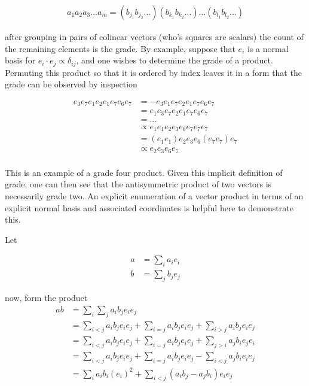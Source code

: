 \begin{align*}
a_1 a_2 a_3 ... a_m = (b_{j_1} b_{j_2} ... ) (b_{k_1} b_{k_2} ... ) ...  (b_{l_1} b_{l_2} ... )
\end{align*}

after grouping in pairs of colinear vectors (who's squares are scalars) the count of the remaining elements is the grade.  By  
example, suppose that ${e_i}$ is a normal basis for  $e_i \cdot e_j \propto \delta_{ij}$, and one wishes to determine the grade
of a product.  Permuting this product so that it is ordered by index leaves it in a form that the grade can be observed by inspection

\begin{align*}
e_3 e_7 e_1 e_2 e_1 e_7 e_6 e_7 
&= - e_3 e_1 e_7 e_2 e_1 e_7 e_6 e_7 \\
&= e_1 e_3 e_7 e_2 e_1 e_7 e_6 e_7 \\
&= ... \\
&\propto e_1 e_1 e_2 e_3 e_6 e_7 e_7 e_7 \\
&= (e_1 e_1) e_2 e_3 e_6 (e_7 e_7) e_7 \\
&\propto e_2 e_3 e_6 e_7 \\
\end{align*}

This is an example of a grade four product.  Given this implicit definition of grade, one can then see that the antisymmetric product of
two vectors is necessarily grade two.  An explicit enumeration of a vector product in terms of an explicit normal basis and associated 
coordinates is helpful here to demonstrate this.

Let

\begin{align*}
a &= \sum_i a_i e_i \\
b &= \sum_j b_j e_j
\end{align*}

now, form the product
\begin{align*}
a b
&= \sum_i \sum_j a_i b_j e_i e_j \\
&= 
 \sum_{i < j} a_i b_j e_i e_j 
+\sum_{i = j} a_i b_j e_i e_j 
+\sum_{i > j} a_i b_j e_i e_j \\
&= 
 \sum_{i < j} a_i b_j e_i e_j 
+\sum_{i = j} a_i b_j e_i e_j 
+\sum_{j > i} a_j b_i e_j e_i \\
&= 
 \sum_{i < j} a_i b_j e_i e_j 
+\sum_{i = j} a_i b_j e_i e_j 
-\sum_{i < j} a_j b_i e_i e_j \\
&= \sum_{i} a_i b_i (e_i)^2 
+ \sum_{i < j} (a_i b_j - a_j b_i) e_i e_j  \\
\end{align*}

